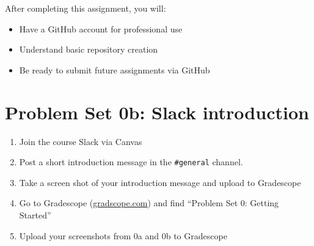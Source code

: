 \documentclass[
  11pt,
  letterpaper]{article}
\providecommand{\tightlist}{%
  \setlength{\itemsep}{0pt}\setlength{\parskip}{0pt}}
\begin{document}
After completing this assignment, you will:

\begin{itemize}
\tightlist
\item
  Have a GitHub account for professional use
\item
  Understand basic repository creation
\item
  Be ready to submit future assignments via GitHub
\end{itemize}

\section{Problem Set 0b: Slack
introduction}\label{problem-set-0b-slack-introduction}

\begin{enumerate}
\def\labelenumi{\arabic{enumi}.}
\tightlist
\item
  Join the course Slack via Canvas
\item
  Post a short introduction message in the \texttt{\#general} channel.
\item
  Take a screen shot of your introduction message and upload to
  Gradescope
\item
  Go to Gradescope (\url{gradscope.com}) and find ``Problem Set 0:
  Getting Started''
\item
  Upload your screenshots from 0a and 0b to Gradescope
\end{enumerate}
\end{document}
